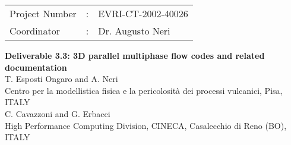 \Large
\begin{center}
\begin{figure}[h]
\setlength{\unitlength}{1mm}
\centerline{}
\end{figure}

\begin{tabular}{lcl}
Project Number &: & EVRI-CT-2002-40026\\
Coordinator &: & Dr. Augusto Neri\\
\end{tabular}
\vspace{1cm}

\huge
{\bf Deliverable 3.3: 3D parallel multiphase flow codes and related documentation}\\[2cm]

\Large
T. Esposti Ongaro and A. Neri\\[5mm]

\normalsize
Centro per la modellistica fisica e la pericolosit\`a dei processi vulcanici, Pisa, ITALY\\[5mm]

\Large
C. Cavazzoni and G. Erbacci\\[5mm]

\normalsize
High Performance Computing Division, CINECA, Casalecchio di Reno (BO),
ITALY\\[5mm]
\end{center}
\normalsize
\newpage
